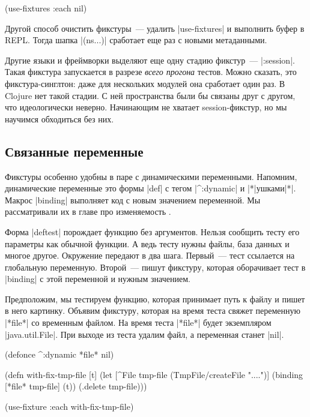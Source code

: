 \begin{english}
  \begin{clojure}
(use-fixtures :each nil)
  \end{clojure}
\end{english}

Другой способ очистить фикстуры~--- удалить \spverb|use-fixtures| и выполнить
буфер в REPL. Тогда шапка \spverb|(ns...)| сработает еще раз с новыми
метаданными.

Другие языки и фреймворки выделяют еще одну стадию фикстур~---
\spverb|:session|. Такая фикстура запускается в разрезе \emph{всего прогона}
тестов. Можно сказать, это фикстура-синглтон: даже для нескольких модулей она
сработает один раз. В Clojure нет такой стадии. С ней пространства были бы
связаны друг с другом, что идеологически неверно. Начинающим не хватает
session-фикстур, но мы научимся обходиться без них.

\subsection{Связанные переменные}

Фикстуры особенно удобны в паре с динамическими переменными. Напомним,
динамические переменные это формы \spverb|def| с тегом \spverb|^:dynamic| и
\spverb|*|ушками\spverb|*|. Макрос \spverb|binding| выполняет код с новым
значением переменной. Мы рассматривали их в главе про
изменяемость .

Форма \spverb|deftest| порождает функцию без аргументов. Нельзя сообщить тесту
его параметры как обычной функции. А ведь тесту нужны файлы, база данных и
многое другое. Окружение передают в два шага. Первый~--- тест ссылается на
глобальную переменную. Второй~--- пишут фикстуру, которая оборачивает тест в
\spverb|binding| с этой переменной и нужным значением.

Предположим, мы тестируем функцию, которая принимает путь к файлу и пишет в него
картинку. Объявим фикстуру, которая на время теста свяжет переменную
\spverb|*file*| со временным файлом. На время теста \spverb|*file*| будет
экземпляром \spverb|java.util.File|. При выходе из теста удалим файл, а
переменная станет \spverb|nil|.

\begin{english}
  \begin{clojure}
(defonce ^:dynamic *file* nil)

(defn with-fix-tmp-file [t]
  (let [^File tmp-file (TmpFile/createFile "....")]
    (binding [*file* tmp-file]
      (t))
    (.delete tmp-file)))

(use-fixture :each with-fix-tmp-file)
  \end{clojure}
\end{english}

